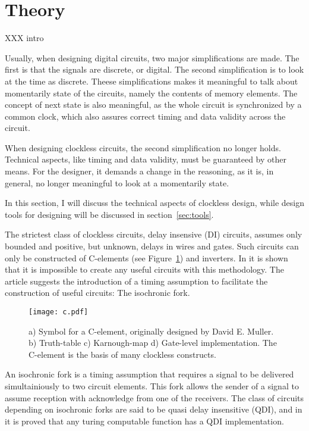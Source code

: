 \section{Theory}

XXX intro

Usually, when designing digital circuits, two major simplifications
are made. The first is that the signals are discrete, or digital. The
second simplification is to look at the time as discrete. Theese
simplifications makes it meaningful to talk about momentarily state of
the circuits, namely the contents of memory elements. The concept of
next state is also meaningful, as the whole circuit is synchronized by
a common clock, which also assures correct timing and data validity
across the circuit.

When designing clockless circuits, the second simplification no longer
holds. Technical aspects, like timing and data validity, must be
guaranteed by other means. For the designer, it demands a change in
the reasoning, as it is, in general, no longer meaningful to look at a
momentarily state.

In this section, I will discuss the technical aspects of clockless
design, while design tools for designing will be discussed in
section~\ref{sec:tools}.

The strictest class of clockless circuits, delay insensive (DI)
circuits, assumes only bounded and positive, but unknown, delays in
wires and gates. Such circuits can only be constructed of C-elements
(see Figure~\ref{fig:c}) and inverters. In \cite{dilimit} it is shown
that it is impossible to create any useful circuits with this
methodology. The article suggests the introduction of a timing
assumption to facilitate the construction of useful circuits: The
isochronic fork.

\begin{figure}[htbp]
  \centering
  \texttt{[image: c.pdf]}
  \caption{a) Symbol for a C-element, originally designed by David
    E. Muller. b) Truth-table c) Karnough-map d) Gate-level
    implementation. The C-element is the basis of many clockless
    constructs.}
  \label{fig:c}
\end{figure}

An isochronic fork is a timing assumption that requires a signal to be
delivered simultainiously to two circuit elements. This fork allows
the sender of a signal to assume reception with acknowledge from one
of the receivers. The class of circuits depending on isochronic forks
are said to be quasi delay insensitive (QDI), and in \cite{turing} it
is proved that any turing computable function has a QDI
implementation.

